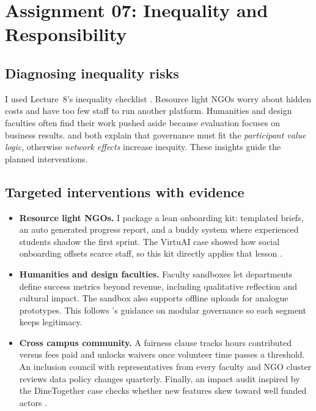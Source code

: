 \section*{Assignment 07: Inequality and Responsibility}

\subsection*{Diagnosing inequality risks}
I used Lecture~8’s inequality checklist \citep{Lecture08}. Resource light NGOs worry about hidden costs and have too few staff to run another platform. Humanities and design faculties often find their work pushed aside because evaluation focuses on business results. \citet{Srnicek2017} and \citet{Choudary2016} both explain that governance must fit the \textit{participant value logic}, otherwise \textit{network effects} increase inequity. These insights guide the planned interventions.

\subsection*{Targeted interventions with evidence}
\begin{itemize}
  \item \textbf{Resource light NGOs.} I package a lean onboarding kit: templated briefs, an auto generated progress report, and a buddy system where experienced students shadow the first sprint. The VirtuAI case showed how social onboarding offsets scarce staff, so this kit directly applies that lesson \citep{Gunasilan2024}.
  \item \textbf{Humanities and design faculties.} Faculty sandboxes let departments define success metrics beyond revenue, including qualitative reflection and cultural impact. The sandbox also supports offline uploads for analogue prototypes. This follows \citet{Reillier2017}'s guidance on modular governance so each segment keeps legitimacy.
  \item \textbf{Cross campus community.} A fairness clause tracks hours contributed versus fees paid and unlocks waivers once volunteer time passes a threshold. An inclusion council with representatives from every faculty and NGO cluster reviews data policy changes quarterly. Finally, an impact audit inspired by the DineTogether case checks whether new features skew toward well funded actors \citep{Rennella2023}.
\end{itemize}

